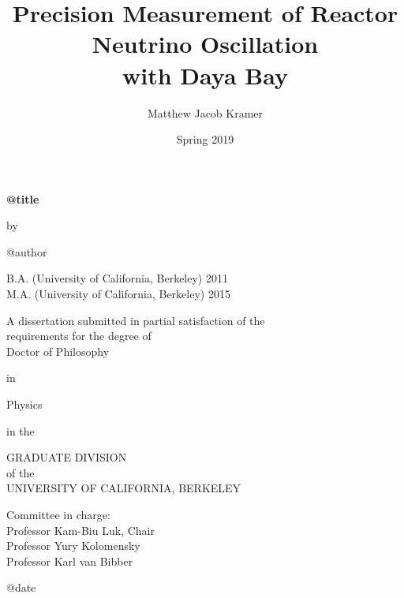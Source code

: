 \documentclass[11pt,oneside]{memoir}
\title{Precision Measurement of Reactor Neutrino Oscillation\\ with Daya Bay}
\author{Matthew Jacob Kramer}
\date{Spring 2019}
\begin{document}
\nocite{*}

\thispagestyle{empty}
{\fontsize{12}{14.5}\selectfont

\begin{center}
  \textbf{\csname @title\endcsname}
  
  \vspace{\baselineskip} by %

  \vspace{\baselineskip} \csname @author\endcsname

  \vspace{2\baselineskip}
  B.A. (University of California, Berkeley) 2011\\
  M.A. (University of California, Berkeley) 2015
  \vspace{2\baselineskip}

  A dissertation submitted in partial satisfaction of the\\
  \OnehalfSpacing\fontsize{12}{14.5}\selectfont
  requirements for the degree of\\
  Doctor of Philosophy

  \SingleSpacing\fontsize{12}{14.5}\selectfont in
  \par\vspace{\baselineskip} Physics
  \par\vspace{\baselineskip} in the
  \par\vspace{\baselineskip}
  GRADUATE DIVISION\\
  \OnehalfSpacing\fontsize{12}{14.5}\selectfont 
  of the\\
  UNIVERSITY OF CALIFORNIA, BERKELEY

  \vfill\SingleSpacing\fontsize{12}{14.5}\selectfont

  Committee in charge:\\
  Professor Kam-Biu Luk, Chair\\
  Professor Yury Kolomensky\\
  Professor Karl van Bibber

  \vspace{2\baselineskip} \csname @date\endcsname
\end{center}
} %

\DoubleSpacing

\frontmatter


\tableofcontents*{}

\mainmatter



\backmatter

\printbibliography
\end{document}
